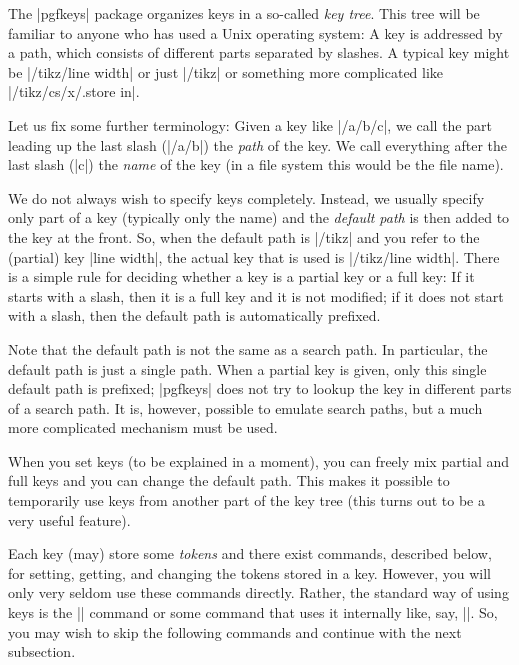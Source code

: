 The |pgfkeys| package organizes keys in a so-called \emph{key
  tree}. This tree will be familiar to anyone who has used a Unix
operating system: A key is addressed by a path, which consists of
different parts separated by slashes. A typical key might be
|/tikz/line width| or just |/tikz| or something more complicated like
|/tikz/cs/x/.store in|.

Let us fix some further terminology: Given a key like |/a/b/c|, we
call the part leading up the last slash (|/a/b|) the \emph{path} of
the key. We call everything after the last slash (|c|) the \emph{name}
of the key (in a file system this would be the file name). 

We do not always wish to specify keys completely. Instead, we usually
specify only part of a key (typically only the name) and the
\emph{default path} is then added to the key at the front. So, when
the default path is |/tikz| and you 
refer to the (partial) key |line width|, the actual key that is used
is |/tikz/line width|. There is a simple rule for deciding whether a
key is a partial key or a full key: If it starts with a slash, then it
is a full key and it is not modified; if it does not start with
a slash, then the default path is automatically prefixed.

Note that the default path is not the same as a search path. In
particular, the default path is just a single path. When a partial key
is given, only this single default path is prefixed; |pgfkeys| does
not try to lookup the key in different parts of a search path. It is,
however, possible to emulate search paths, but a much more
complicated mechanism must be used.

When you set keys (to be explained in a moment), you can freely mix
partial and full keys and you can change the default path. This makes
it possible to temporarily use keys from another part of the key tree
(this turns out to be a very useful feature).

Each key (may) store some \emph{tokens} and there exist commands,
described below, for setting, getting, and changing the tokens stored
in a key. However, you will only very seldom use these commands
directly. Rather, the standard way of using keys is the |\pgfkeys|
command or some command that uses it internally like, say,
|\tikzset|. So, you may wish to skip the following commands and
continue with the next subsection.

